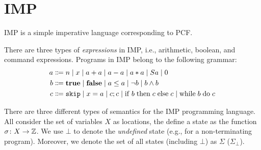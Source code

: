 


\section{IMP}

\begin{remark}
      IMP is a simple imperative language corresponding to PCF.
\end{remark}

\begin{definition}
There are three types of \emph{expressions} in IMP, i.e., 
arithmetic, boolean, and command expressions. Programs in IMP belong to the following grammar:
\begin{align*}
    a &\Coloneqq n \;|\; x \;|\; a + a \;|\; a - a \;|\; a * a \;|\; S a \;|\; 0\\
    b &\Coloneqq \mathbf{true} \;|\; \mathbf{false}  \;|\; a \leq a \;|\; \neg b \;|\; b \land b\\
    c &\Coloneqq \mathtt{skip} \;|\; x = a \;|\; c; c \;|\; \mathrm{if}\;b\;\mathrm{then}\;c\;\mathrm{else}\;c\;|\; \mathrm{while}\;b\;\mathrm{do}\;c
\end{align*}
\end{definition}

\begin{definition}
    There are three different types of semantics for the IMP programming language. All consider the set of variables $X$ as locations, the define a state as the function $\sigma\colon X \to \mathbb{Z}$. We use $\bot$ to denote the \emph{undefined} state (e.g., for a non-terminating program).
    Moreover, we denote the set of all states (including $\bot$) as $\Sigma$ ($\Sigma_{\bot}$).
\end{definition}




